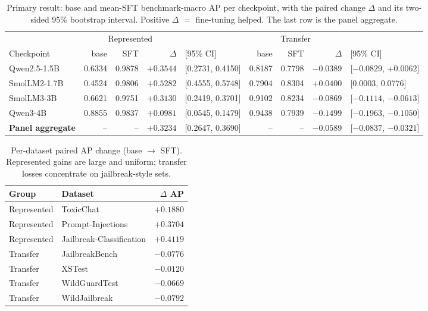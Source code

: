 \documentclass[11pt]{article}
\begin{document}
\begin{table}[t]
\centering\small
\caption{Primary result: base and mean-SFT benchmark-macro AP per checkpoint, with the paired
change $\Delta$ and its two-sided 95\% bootstrap interval. Positive $\Delta$ $=$ fine-tuning
helped. The last row is the panel aggregate.}
\label{tab:primary}
\setlength{\tabcolsep}{3pt}
\begin{tabular}{l rr r@{\ }l rr r@{\ }l}
\toprule
& \multicolumn{3}{c}{Represented} && \multicolumn{3}{c}{Transfer} &\\
\cmidrule(lr){2-4}\cmidrule(lr){6-8}
Checkpoint & base & SFT & $\Delta$ & [95\% CI] & base & SFT & $\Delta$ & [95\% CI]\\
\midrule
Qwen2.5-1.5B & 0.6334 & 0.9878 & $+0.3544$ & [0.2731, 0.4150] & 0.8187 & 0.7798 & $-0.0389$ & [$-0.0829$, $+0.0062$]\\
SmolLM2-1.7B & 0.4524 & 0.9806 & $+0.5282$ & [0.4555, 0.5748] & 0.7904 & 0.8304 & $+0.0400$ & [0.0003, 0.0776]\\
SmolLM3-3B  & 0.6621 & 0.9751 & $+0.3130$ & [0.2419, 0.3701] & 0.9102 & 0.8234 & $-0.0869$ & [$-0.1114$, $-0.0613$]\\
Qwen3-4B   & 0.8855 & 0.9837 & $+0.0981$ & [0.0545, 0.1479] & 0.9438 & 0.7939 & $-0.1499$ & [$-0.1963$, $-0.1050$]\\
\midrule
\textbf{Panel aggregate} & -- & -- & $+0.3234$ & [0.2647, 0.3690] & -- & -- & $-0.0589$ & [$-0.0837$, $-0.0321$]\\
\bottomrule
\end{tabular}
\end{table}

\begin{table}[t]
\centering\small
\caption{Per-dataset paired AP change (base $\to$ SFT). Represented gains are large and
uniform; transfer losses concentrate on jailbreak-style sets.}
\label{tab:perbench}
\begin{tabular}{llr}
\toprule
Group & Dataset & $\Delta$ AP \\
\midrule
Represented & ToxicChat & $+0.1880$ \\
Represented & Prompt-Injections & $+0.3704$ \\
Represented & Jailbreak-Classification & $+0.4119$ \\
\midrule
Transfer & JailbreakBench & $-0.0776$ \\
Transfer & XSTest & $-0.0120$ \\
Transfer & WildGuardTest & $-0.0669$ \\
Transfer & WildJailbreak & $-0.0792$ \\
\bottomrule
\end{tabular}
\end{table}
\end{document}
